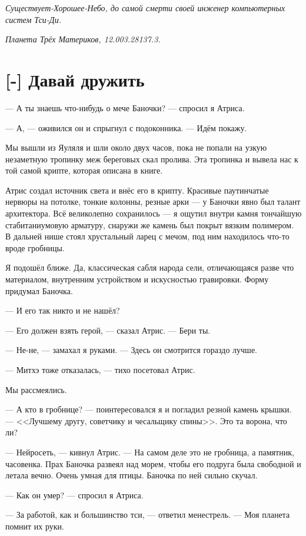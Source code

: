 \emph{Существует-Хорошее-Небо, до самой смерти своей инженер компьютерных систем Тси-Ди.}

\emph{Планета Трёх Материков, 12.003.28137.3.}

\section{[-] Давай дружить}

\textspace

--- А ты знаешь что-нибудь о мече Баночки? --- спросил я Атриса.

--- А, --- оживился он и спрыгнул с подоконника.
--- Идём покажу.

Мы вышли из Яуляля и шли около двух часов, пока не попали на узкую незаметную тропинку меж береговых скал пролива.
Эта тропинка и вывела нас к той самой крипте, которая описана в книге.

Атрис создал источник света и внёс его в крипту.
Красивые паутинчатые нервюры на потолке, тонкие колонны, резные арки --- у Баночки явно был талант архитектора.
Всё великолепно сохранилось --- я ощутил внутри камня тончайшую стабитаниумовую арматуру, снаружи же камень был покрыт вязким полимером.
В дальней нише стоял хрустальный ларец с мечом, под ним находилось что-то вроде гробницы.

Я подошёл ближе.
Да, классическая сабля народа сели, отличающаяся разве что материалом, внутренним устройством и искусностью гравировки.
Форму придумал Баночка.

--- И его так никто и не нашёл?

--- Его должен взять герой, --- сказал Атрис.
--- Бери ты.

--- Не-не, --- замахал я руками.
--- Здесь он смотрится гораздо лучше.

--- Митхэ тоже отказалась, --- тихо посетовал Атрис.

Мы рассмеялись.

--- А кто в гробнице? --- поинтересовался я и погладил резной камень крышки.
--- <<Лучшему другу, советчику и чесальщику спины>>.
Это та ворона, что ли?

--- Нейросеть, --- кивнул Атрис.
--- На самом деле это не гробница, а памятник, часовенка.
Прах Баночка развеял над морем, чтобы его подруга была свободной и летала вечно.
Очень умная для птицы.
Баночка по ней сильно скучал.

--- Как он умер? --- спросил я Атриса.

--- За работой, как и большинство тси, --- ответил менестрель.
--- Моя планета помнит их руки.

